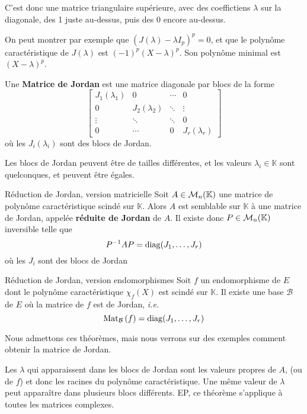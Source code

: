     C’est donc une matrice triangulaire supérieure, avec des coeffictiens $\lambda$ sur la diagonale, des 1 juste au-dessus, puis des 0 encore au-dessus. 

    On peut montrer par exemple que $(J(\lambda) - \lambda I_p)^p = 0$, et que le polynôme caractéristique de $J(\lambda)$ est $(-1)^p(X - \lambda)^p$. Son polynôme minimal est $(X - \lambda)^p$.

    \begin{defi}{}{}
        Une \textbf{Matrice de Jordan} est une matrice diagonale par blocs de la forme 
        \[ \begin{bmatrix}
            J_1(\lambda_1) & 0 & \cdots & 0 \\
            0 & J_2(\lambda_2) & \ddots & \vdots \\
            \vdots & \ddots & \ddots & 0 \\
            0 & \cdots & 0 & J_r(\lambda_r) 
        \end{bmatrix} \]  
        où les $J_i(\lambda_i)$ sont des blocs de Jordan.
    \end{defi}

    Les blocs de Jordan peuvent être de tailles différentes, et les valeurs $\lambda_i \in \mathbb{K}$ sont quelconques, et peuvent être égales.

    \begin{theo}{Réduction de Jordan, version matricielle}{}
        Soit $A \in \mathcal{M}_{n}(\mathbb{K})$ une matrice de polynôme caractéristique scindé sur $\mathbb{K}$. Alors $A$ est semblable sur $\mathbb{K}$ à une matrice de Jordan, appelée \textbf{réduite de Jordan} de $A$. Il existe donc $P \in \mathcal{M}_{n}(\mathbb{K})$ inversible telle que 
        \[ P^{-1} A P = \operatorname{diag}(J_1,\ldots,J_r) \]   
        où les $J_i$ sont des blocs de Jordan
    \end{theo}

    \begin{theo}{Réduction de Jordan, version endomorphismes}{}
        Soit $f$ un endomorphisme de $E$ dont le polynôme caractéristique $\chi_f(X)$ est scindé sur $\mathbb{K}$. Il existe une base $\mathcal{B}$ de $E$ où la matrice de $f$ est de Jordan, \textit{i.e.} 
        \[ \text{Mat}_{\mathcal{B}}\left(f\right) = \operatorname{diag}(J_1,\ldots,J_r) \]   
    \end{theo}

    Nous admettons ces théorèmes, mais nous verrons sur des exemples comment obtenir la matrice de Jordan. 

    Les $\lambda$ qui apparaissent dans les blocs de Jordan sont les valeurs propres de $A$, (ou de $f$) et donc les racines du polynôme caractéristique. Une même valeur de $\lambda$ peut apparaître dans plusieurs blocs différents. EP, ce théorème s’applique à toutes les matrices complexes. 

